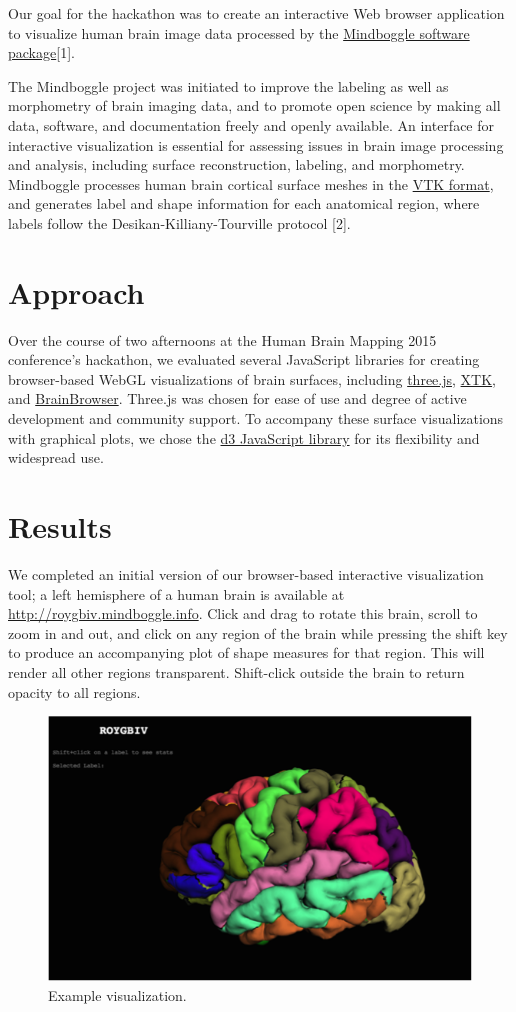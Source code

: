 \documentclass[twocolumn]{bmcart}%
\begin{document}
Our goal for the hackathon was to create an interactive Web browser
application to visualize human brain image data processed by the
\href{http://mindboggle.info/}{Mindboggle software package}{[}1{]}.

The Mindboggle project was initiated to improve the labeling as well as
morphometry of brain imaging data, and to promote open science by making
all data, software, and documentation freely and openly available. An
interface for interactive visualization is essential for assessing
issues in brain image processing and analysis, including surface
reconstruction, labeling, and morphometry. Mindboggle processes human
brain cortical surface meshes in the \href{http://www.vtk.org/}{VTK
format}, and generates label and shape information for each anatomical
region, where labels follow the Desikan-Killiany-Tourville protocol
{[}2{]}.

\section{Approach}\label{approach}

Over the course of two afternoons at the Human Brain Mapping 2015
conference's hackathon, we evaluated several JavaScript libraries for
creating browser-based WebGL visualizations of brain surfaces, including
\href{http://threejs.org/}{three.js},
\href{https://github.com/xtk/X\#readme}{XTK}, and
\href{https://brainbrowser.cbrain.mcgill.ca/}{BrainBrowser}. Three.js
was chosen for ease of use and degree of active development and
community support. To accompany these surface visualizations with
graphical plots, we chose the \href{http://d3js.org/}{d3 JavaScript
library} for its flexibility and widespread use.

\section{Results}\label{results}

We completed an initial version of our browser-based interactive
visualization tool; a left hemisphere of a human brain is available at
\url{http://roygbiv.mindboggle.info}. Click and drag to rotate this
brain, scroll to zoom in and out, and click on any region of the brain
while pressing the shift key to produce an accompanying plot of shape
measures for that region. This will render all other regions
transparent. Shift-click outside the brain to return opacity to all
regions.

\begin{figure}[h!] \includegraphics[width=.42\textwidth]{roygbiv.png} \caption{\label{centfig} Example visualization.} \end{figure}
\end{document}
